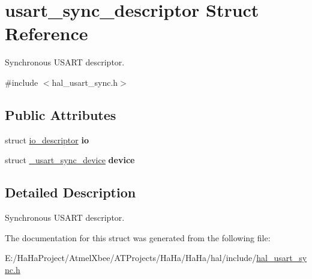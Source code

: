 \hypertarget{structusart__sync__descriptor}{}\section{usart\+\_\+sync\+\_\+descriptor Struct Reference}
\label{structusart__sync__descriptor}


Synchronous U\+S\+A\+RT descriptor.  




{\ttfamily \#include $<$hal\+\_\+usart\+\_\+sync.\+h$>$}

\subsection*{Public Attributes}
\begin{DoxyCompactItemize}
\item 
\mbox{\label{structusart__sync__descriptor_a9ef5dd1d1c2010fc961d3e803c7429cb}} 
struct \hyperlink{structio__descriptor}{io\+\_\+descriptor} {\bfseries io}
\item 
\mbox{\label{structusart__sync__descriptor_a825cfcdd7f23413952a2a198b8a07ad5}} 
struct \hyperlink{struct__usart__sync__device}{\+\_\+usart\+\_\+sync\+\_\+device} {\bfseries device}
\end{DoxyCompactItemize}


\subsection{Detailed Description}
Synchronous U\+S\+A\+RT descriptor. 

The documentation for this struct was generated from the following file\+:\begin{DoxyCompactItemize}
\item 
E\+:/\+Ha\+Ha\+Project/\+Atmel\+Xbee/\+A\+T\+Projects/\+Ha\+Ha/\+Ha\+Ha/hal/include/\hyperlink{hal__usart__sync_8h}{hal\+\_\+usart\+\_\+sync.\+h}\end{DoxyCompactItemize}

